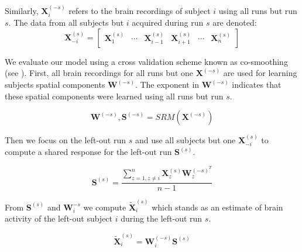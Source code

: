 Similarly, $\mathbf{X}_i^{(-s)}$ refers to the brain recordings of subject $i$ using all runs but run $s$. The data from all subjects but $i$ acquired during run $s$ are denoted:
\begin{equation*}
	\mathbf{X}^{(s)}_{-i} = 
\begin{bmatrix}
	\mathbf{X}_1^{(s)} & \cdots & \mathbf{X}^{(s)}_{i-1} & \mathbf{X}^{(s)}_{i+1} & \cdots & \mathbf{X}^{(s)}_{n} 
\end{bmatrix}
\end{equation*}

We evaluate our model using a cross validation scheme known as co-smoothing (see \cite{wu2018learning}). First, all brain recordings for all runs but one $\mathbf{X}^{(-s)}$ are used for learning subjects spatial components $\mathbf{W}^{(-s)}$. The exponent in $\mathbf{W}^{(-s)}$ indicates that these spatial components were learned using all runs but run $s$. 

\begin{equation*}
	\mathbf{W}^{(-s)}, \mathbf{S}^{(-s)} = SRM(\mathbf{X}^{(-s)})
\end{equation*}

Then we focus on the left-out run $s$ and use all subjects but one $\mathbf{X}^{(s)}_{-i}$ to compute a shared response for the left-out run $\mathbf{S}^{(s)}$.

\begin{equation*}
	\mathbf{S}^{(s)} = \frac{\sum_{z=1, z\neq i}^n \mathbf{X}^{(s)}_z\mathbf{W}^{(-s)^T}_z}{n - 1}
\end{equation*}

From $\mathbf{S}^{(s)}$ and $\mathbf{W}_i^{-s}$ we compute $\widetilde{\mathbf{X}}^{(s)}_i$ which stands as an estimate of brain activity of the left-out subject $i$ during the left-out run $s$.

\begin{equation*}
	\widetilde{\mathbf{X}}_i^{(s)} = \mathbf{W}^{(-s)}_i \mathbf{S}^{(s)}
\end{equation*}


